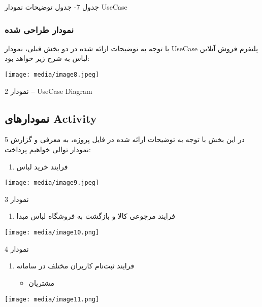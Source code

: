\documentclass[]{article}
\begin{document}
جدول 7- جدول توضیحات نمودار UseCase

\subsubsection{نمودار طراحی
شده}\label{ux646ux645ux648ux62fux627ux631-ux637ux631ux627ux62dux6cc-ux634ux62fux647}

با توجه به توضیحات ارائه شده در دو بخش قبلی، نمودار UseCase پلتفرم فروش
آنلاین لباس به شرح زیر خواهد بود:

\texttt{[image: media/image8.jpeg]}

نمودار 2 -- UseCase Diagram

\subsection{نمودارهای
Activity}\label{ux646ux645ux648ux62fux627ux631ux647ux627ux6cc-activity}

در این بخش با توجه به توضیحات ارائه شده در فایل پروژه، به معرفی و گزارش
5 نمودار توالی خواهیم پرداخت:

\begin{enumerate}
\def\labelenumi{\arabic{enumi})}
\item
  فرایند خرید لباس
\end{enumerate}

\texttt{[image: media/image9.jpeg]}

نمودار 3

\begin{enumerate}
\def\labelenumi{\arabic{enumi})}
\item
  فرایند مرجوعی کالا و بازگشت به فروشگاه لباس مبدا
\end{enumerate}

\texttt{[image: media/image10.png]}

نمودار 4

\begin{enumerate}
\def\labelenumi{\arabic{enumi})}
\item
  فرایند ثبت‌نام کاربران مختلف در سامانه

  \begin{itemize}
  \item
    مشتریان
  \end{itemize}
\end{enumerate}

\texttt{[image: media/image11.png]}
\end{document}
